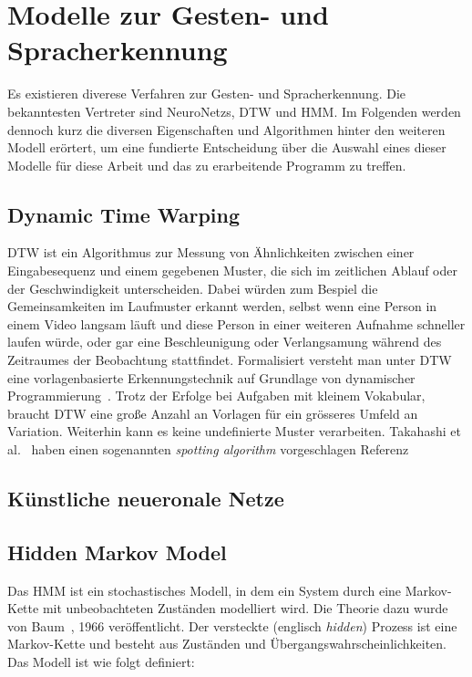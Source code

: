 \chapter{Modelle zur Gesten- und Spracherkennung}
\label{chap:Modelle}
Es existieren diverese Verfahren zur Gesten- und Spracherkennung. Die bekanntesten Vertreter sind \glspl{NeuroNetz}, \gls{DTW} und \gls{HMM}.
\newline
Im Folgenden werden dennoch kurz die diversen Eigenschaften und Algorithmen hinter den weiteren Modell er\"ortert, um eine fundierte Entscheidung \"uber die Auswahl eines dieser Modelle f\"ur diese Arbeit und das zu erarbeitende Programm zu treffen.
 

\section{Dynamic Time Warping}
\gls{DTW} ist ein Algorithmus zur Messung von \"Ahnlichkeiten zwischen einer Eingabesequenz und einem gegebenen Muster, die sich im zeitlichen Ablauf oder der Geschwindigkeit unterscheiden. Dabei w\"urden zum Bespiel die Gemeinsamkeiten im Laufmuster erkannt werden, selbst wenn eine Person in einem Video langsam l\"auft und diese Person in einer weiteren Aufnahme schneller laufen w\"urde, oder gar eine Beschleunigung oder Verlangsamung w\"ahrend des Zeitraumes der Beobachtung stattfindet.
\newline
Formalisiert versteht man unter \acrshort{DTW} eine vorlagenbasierte Erkennungstechnik auf Grundlage von dynamischer Programmierung~\cite[S.~963]{bib:hmmlee}.
Trotz der Erfolge bei Aufgaben mit kleinem Vokabular, braucht \acrshort{DTW} eine gro\ss e Anzahl an Vorlagen f\"ur ein gr\"osseres Umfeld an Variation. Weiterhin kann es keine undefinierte Muster verarbeiten.
\newline
Takahashi et al.~\cite{bib:takahashi} haben einen sogenannten \textit{spotting algorithm} vorgeschlagen 
Referenz~\cite{bib:finlay}~\cite{bib:kober}


\section{K\"unstliche neueronale Netze}

\section{Hidden Markov Model}
Das \gls{HMM} ist ein stochastisches Modell, in dem ein System durch eine Markov-Kette mit unbeobachteten Zust\"anden modelliert wird.
Die Theorie dazu wurde von Baum~\cite{bib:hmmbaum}, 1966 ver\"offentlicht.
\newline
Der versteckte (englisch \textit{hidden}) Prozess ist eine Markov-Kette und besteht aus Zust\"anden und \"Ubergangswahrscheinlichkeiten.
Das Modell ist wie folgt definiert:

